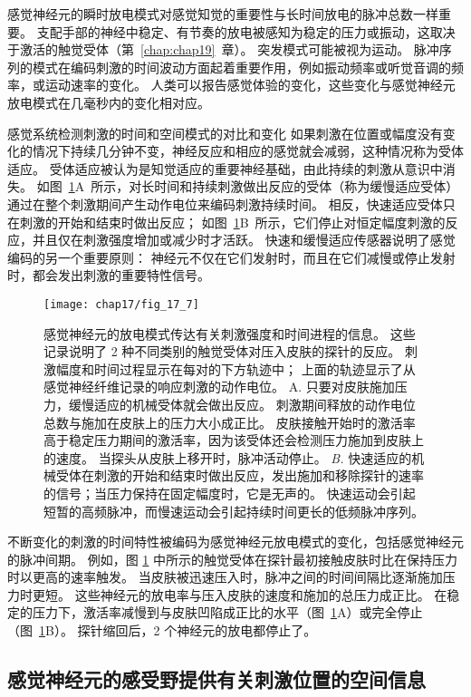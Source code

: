 感觉神经元的瞬时放电模式对感觉知觉的重要性与长时间放电的脉冲总数一样重要。 
支配手部的神经中稳定、有节奏的放电被感知为稳定的压力或振动，这取决于激活的触觉受体（第~\ref{chap:chap19}~章）。 
突发模式可能被视为运动。 
脉冲序列的模式在编码刺激的时间波动方面起着重要作用，例如振动频率或听觉音调的频率，或运动速率的变化。 
人类可以报告感觉体验的变化，这些变化与感觉神经元放电模式在几毫秒内的变化相对应。


感觉系统检测刺激的时间和空间模式的对比和变化
如果刺激在位置或幅度没有变化的情况下持续几分钟不变，神经反应和相应的感觉就会减弱，这种情况称为受体适应。 
受体适应被认为是知觉适应的重要神经基础，由此持续的刺激从意识中消失。
如图~\ref{fig:17_7}A~所示，对长时间和持续刺激做出反应的受体（称为缓慢适应受体）通过在整个刺激期间产生动作电位来编码刺激持续时间。
相反，快速适应受体只在刺激的开始和结束时做出反应； 
如图~\ref{fig:17_7}B~所示，它们停止对恒定幅度刺激的反应，并且仅在刺激强度增加或减少时才活跃。
快速和缓慢适应传感器说明了感觉编码的另一个重要原则：
神经元不仅在它们发射时，而且在它们减慢或停止发射时，都会发出刺激的重要特性信号。


\begin{figure}[htbp]
	\centering
	\texttt{[image: chap17/fig\_17\_7]}
	\caption{感觉神经元的放电模式传达有关刺激强度和时间进程的信息。
		这些记录说明了 2 种不同类别的触觉受体对压入皮肤的探针的反应。
		刺激幅度和时间过程显示在每对的下方轨迹中； 
		上面的轨迹显示了从感觉神经纤维记录的响应刺激的动作电位。 
		A. 只要对皮肤施加压力，缓慢适应的机械受体就会做出反应。 
		刺激期间释放的动作电位总数与施加在皮肤上的压力大小成正比。
		皮肤接触开始时的激活率高于稳定压力期间的激活率，因为该受体还会检测压力施加到皮肤上的速度。
		当探头从皮肤上移开时，脉冲活动停止\cite{mountcastle1966neural}。
		\textit{B.} 快速适应的机械受体在刺激的开始和结束时做出反应，发出施加和移除探针的速率的信号；当压力保持在固定幅度时，它是无声的。
		快速运动会引起短暂的高频脉冲，而慢速运动会引起持续时间更长的低频脉冲序列\cite{talbot1968sense}。}
	\label{fig:17_7}
\end{figure}


不断变化的刺激的时间特性被编码为感觉神经元放电模式的变化，包括感觉神经元的脉冲间期。
例如，图 \ref{fig:17_7} 中所示的触觉受体在探针最初接触皮肤时比在保持压力时以更高的速率触发。
当皮肤被迅速压入时，脉冲之间的时间间隔比逐渐施加压力时更短。
这些神经元的放电率与压入皮肤的速度和施加的总压力成正比。
在稳定的压力下，激活率减慢到与皮肤凹陷成正比的水平（图~\ref{fig:17_7}A）或完全停止（图~\ref{fig:17_7}B）。
探针缩回后，2 个神经元的放电都停止了。


\subsection{感觉神经元的感受野提供有关刺激位置的空间信息}

